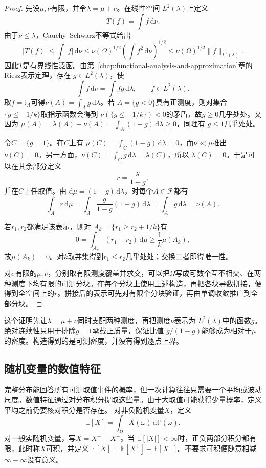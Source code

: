\begin{proof}
先设\(\mu,\nu\)有限，并令\(\lambda=\mu+\nu\)。在线性空间
\(L^2(\lambda)\)上定义
\[
  T(f)=\int f\,\mathrm{d}\nu.
\]
由于\(\nu\leq\lambda\)，Cauchy--Schwarz不等式给出
\[
  |T(f)|
  \leq\int|f|\,\mathrm{d}\nu
  \leq\nu(\Omega)^{1/2}
       \left(\int f^2\,\mathrm{d}\nu\right)^{1/2}
  \leq\nu(\Omega)^{1/2}\lVert f\rVert_{L^2(\lambda)}.
\]
因此\(T\)是有界线性泛函。由第~\ref{chap:functional-analysis-and-approximation}章的Riesz表示定理，存在
\(g\in L^2(\lambda)\)，使
\[
  \int f\,\mathrm{d}\nu=\int fg\,\mathrm{d}\lambda,
  \qquad f\in L^2(\lambda).
\]
取\(f=\mathbb{I}_A\)可得\(\nu(A)=\int_Ag\,\mathrm{d}\lambda\)。若
\(A=\{g<0\}\)具有正测度，则对集合\(\{g\leq-1/k\}\)取指示函数会得到
\(\nu(\{g\leq-1/k\})<0\)的矛盾，故\(g\geq0\)几乎处处。又因为
\(\mu(A)=\lambda(A)-\nu(A)=\int_A(1-g)\,\mathrm{d}\lambda\geq0\)，同理有
\(g\leq1\)几乎处处。

令\(C=\{g=1\}\)。在\(C\)上有
\(\mu(C)=\int_C(1-g)\,\mathrm{d}\lambda=0\)，而\(\nu\ll\mu\)推出
\(\nu(C)=0\)。另一方面，\(\nu(C)=\int_Cg\,\mathrm{d}\lambda=\lambda(C)\)，所以
\(\lambda(C)=0\)。于是可以在其余部分定义
\[
  r=\frac{g}{1-g},
\]
并在\(C\)上任取值。由
\(\mathrm{d}\mu=(1-g)\,\mathrm{d}\lambda\)，对每个\(A\in\mathcal{F}\)都有
\[
  \int_A r\,\mathrm{d}\mu
  =\int_A\frac{g}{1-g}(1-g)\,\mathrm{d}\lambda
  =\int_Ag\,\mathrm{d}\lambda
  =\nu(A).
\]

若\(r_1,r_2\)都满足该表示，则对
\(A_k=\{r_1\geq r_2+1/k\}\)有
\[
  0=\int_{A_k}(r_1-r_2)\,\mathrm{d}\mu
  \geq\frac{1}{k}\mu(A_k),
\]
故\(\mu(A_k)=0\)。对\(k\)取并集得到\(r_1\leq r_2\)几乎处处；交换二者即得唯一性。

对\(\sigma\)有限的\(\mu,\nu\)，分别取有限测度覆盖并求交，可以把\(\Omega\)写成可数个互不相交、在两种测度下均有限的可测分块。在每个分块上使用上述构造，再把各块导数拼接，便得到全空间上的\(r\)。拼接后的表示可先对有限个分块验证，再由单调收敛推广到全部分块。
\end{proof}

这个证明先让\(\lambda=\mu+\nu\)同时支配两种测度，再把测度\(\nu\)表示为
\(L^2(\lambda)\)中的函数\(g\)。绝对连续性只用于排除\(g=1\)承载正质量，保证比值
\(g/(1-g)\)能够成为相对于\(\mu\)的密度。构造得到的是可测密度，并没有得到逐点上界。

\subsection{随机变量的数值特征}
\label{sec:rv-features}

完整分布能回答所有可测取值事件的概率，但一次计算往往只需要一个平均或波动尺度。数值特征通过对分布积分提取这些量。由于大取值可能获得少量概率，定义平均之前仍要核对积分是否存在。
\label{sec:probability-expectation-conditional-expectation}
\label{sec:probability-moment-transforms}
对非负随机变量\(X\)，定义
\[ \mathbb{E}[X]
  =\int_{\Omega}X(\omega)\,\mathrm{d}\mathbb{P}(\omega). \]
对一般实随机变量，写\(X=X^+-X^-\)。当
\(\mathbb{E}[|X|]<\infty\)时，正负两部分积分都有限，此时称\(X\)可积，并定义
\(\mathbb{E}[X]=\mathbb{E}[X^+]-\mathbb{E}[X^-]\)。不要求可积便随意相减\(\infty-\infty\)没有意义。

